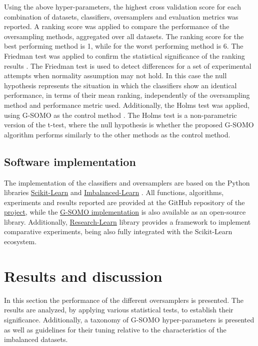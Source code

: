 \documentclass[parskip=full]{scrartcl}
\begin{document}
Using the above hyper-parameters, the highest cross validation score for each combination of datasets, classifiers, oversamplers and evaluation metrics was reported. A ranking score was applied to compare the performance of the oversampling methods, aggregated over all datasets. The ranking score for the best performing method is 1, while for the worst performing method is 6. The Friedman test was applied to confirm the statistical significance of the ranking results \cite{Guyon2003}. The Friedman test is used to detect differences for a set of experimental attempts when normality assumption may not hold. In this case the null hypothesis represents the situation in which the classifiers show an identical performance, in terms of their mean ranking, independently of the oversampling method and performance metric used. Additionally, the Holms test was applied, using G-SOMO as the control method \cite{Guyon2003}. The Holms test is a non-parametric version of the t-test, where the null hypothesis is whether the proposed G-SOMO algorithm performs similarly to the other methods as the control method.

\subsection{Software implementation}

The implementation of the classifiers and oversamplers are based on the Python libraries \href{https://scikit-learn.org/stable/}{Scikit-Learn} \cite{Pedregosa2012} and \href{https://imbalanced-learn.org/en/stable/}{Imbalanced-Learn} \cite{Lemaitre2016}. All functions, algorithms, experiments and results reported are provided at the GitHub repository of the \href{https://github.com/AlgoWit/publications/tree/master/gsomo}{project}, while the \href{https://github.com/AlgoWit/cluster-over-sampling}{ G-SOMO implementation} is also available as an open-source library. Additionally, \href{https://research-learn.readthedocs.io/en/latest/?badge=latest}{Research-Learn} library provides a framework to implement comparative experiments, being also fully integrated with the Scikit-Learn ecosystem.

\section{Results and discussion}

In this section the performance of the different oversamplers is presented. The results are analyzed, by applying various statistical tests, to establish their significance. Additionally, a taxonomy of G-SOMO hyper-parameters is presented as well as guidelines for their tuning relative to the characteristics of the imbalanced datasets.
\end{document}

